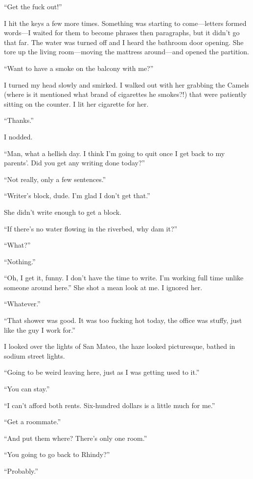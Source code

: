 ``Get the fuck out!''

I hit the keys a few more times. Something was starting to
come---letters formed words---I waited for them to become phrases then
paragraphs, but it didn't go that far. The water was turned off and I
heard the bathroom door opening. She tore up the living room---moving
the mattress around---and opened the partition.

``Want to have a smoke on the balcony with me?''

I turned my head slowly and smirked. I walked out with her grabbing the
Camels (where is it mentioned what brand of cigarettes he smokes?!) that
were patiently sitting on the counter. I lit her cigarette for her.

``Thanks.''

I nodded.

``Man, what a hellish day. I think I'm going to quit once I get back to
my parents'. Did you get any writing done today?''

``Not really, only a few sentences.''

``Writer's block, dude. I'm glad I don't get that.''

She didn't write enough to get a block.

``If there's no water flowing in the riverbed, why dam it?''

``What?''

``Nothing.''

``Oh, I get it, funny. I don't have the time to write. I'm working full
time unlike someone around here.'' She shot a mean look at me. I ignored
her.

``Whatever.''

``That shower was good. It was too fucking hot today, the office was
stuffy, just like the guy I work for.''

I looked over the lights of San Mateo, the haze looked picturesque,
bathed in sodium street lights.

``Going to be weird leaving here, just as I was getting used to it.''

``You can stay.''

``I can't afford both rents. Six-hundred dollars is a little much for
me.''

``Get a roommate.''

``And put them where? There's only one room.''

``You going to go back to Rhindy?''

``Probably.''

